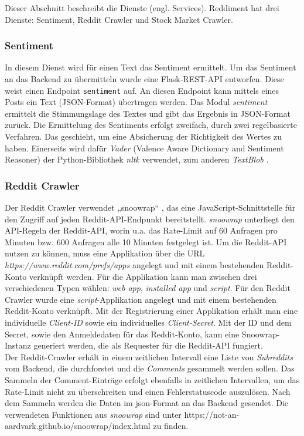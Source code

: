 \documentclass[a4paper, 10pt, conference]{IEEEtran}
\begin{document}
Dieser Abschnitt beschreibt die Dienste (engl. Services). Reddiment hat drei Dienste: Sentiment, Reddit Crawler und Stock Market Crawler.

\subsubsection{Sentiment}

In diesem Dienst wird für einen Text das Sentiment ermittelt. Um das Sentiment an das Backend zu übermitteln wurde eine Flask-REST-API entworfen. Diese weist einen Endpoint \texttt{\/sentiment} auf. An diesen Endpoint kann mittels eines Posts ein Text (JSON-Format) übertragen werden. Das Modul \textit{sentiment} ermittelt die Stimmungslage des Textes und gibt das Ergebnis in JSON-Format zurück. Die Ermittelung des Sentiments erfolgt zweifach, durch zwei regelbasierte Verfahren.  Das geschieht, um eine Absicherung der Richtigkeit des Wertes zu haben. Einerseits wird dafür \textit{Vader} \cite{vader}(Valence Aware Dictionary and Sentiment Reasoner) der Python-Bibliothek \textit{nltk} verwendet, zum anderen \textit{TextBlob} \cite{textblob}.

\subsubsection{Reddit Crawler}

Der Reddit Crawler verwendet „snoowrap“ \cite{snoowrap}, das eine JavaScript-Schnittstelle für den Zugriff auf jeden Reddit-API-Endpunkt bereitstellt. \textit{snoowrap} unterliegt den API-Regeln der Reddit-API, worin u.a. das Rate-Limit auf 60 Anfragen pro Minuten bzw. 600 Anfragen alle 10 Minuten festgelegt ist. Um die Reddit-API nutzen zu können, muss eine Applikation über die URL \textit{https://www.reddit.com/prefs/apps} angelegt und mit einem bestehenden Reddit-Konto verknüpft werden. Für die Applikation kann man zwischen drei verschiedenen Typen wählen: \textit{web app}, \textit{installed app} und \textit{script}. Für den Reddit Crawler wurde eine \textit{script}-Applikation angelegt und mit einem bestehenden Reddit-Konto verknüpft. Mit der Registrierung einer Applikation erhält man eine individuelle \textit{Client-ID} sowie ein individuelles \textit{Client-Secret}. Mit der ID und dem Secret, sowie den Anmeldedaten für das Reddit-Konto, kann eine Snoowrap-Instanz generiert werden, die als Requester für die Reddit-API fungiert.\\
Der Reddit-Crawler erhält in einem zeitlichen Intervall eine Liste von \textit{Subreddits} vom Backend, die durchforstet und die \textit{Comments} gesammelt werden sollen. Das Sammeln der Comment-Einträge erfolgt ebenfalls in zeitlichen Intervallen, um das Rate-Limit nicht zu überschreiten und einen Fehlerstatuscode auszulösen. Nach dem Sammeln werden die Daten im json-Format an das Backend gesendet. Die verwendeten Funktionen aus \textit{snoowrap} sind unter https://not-an-aardvark.github.io/snoowrap/index.html zu finden.
\end{document}
